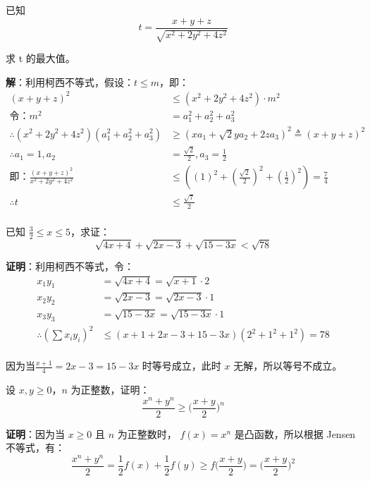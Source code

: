 \documentclass[12pt]{article}
\begin{document}
\begin{framed}
已知
$$
t = \frac{x + y + z}{\sqrt{x^2 + 2y^2 + 4z^2}}
$$ 

求 t 的最大值。

\textbf{解}：利用柯西不等式，假设：$t \le m$，即：
\begin{align*}
(x + y + z)^2 &\le (x^2 + 2y^2 + 4z^2)\cdot m^2 \\
\text{令：} m^2 &= a_1^2 + a_2^2 + a_3^2 \\
\therefore (x^2 + 2y^2 + 4z^2)(a_1^2 + a_2^2 + a_3^2) &\ge (xa_1 + \sqrt{2}ya_2 + 2za_3)^2 \triangleq (x + y + z)^2\\
\therefore a_1 = 1, a_2 &= \frac{\sqrt{2}}{2}, a_3 = \frac{1}{2} \\
\text{即：}\frac{(x + y + z)^2}{x^2 + 2y^2 + 4z^2} &\le ((1)^2 + (\frac{\sqrt{2}}{2})^2 + (\frac{1}{2})^2) = \frac{7}{4} \\
\therefore t &\le \frac{\sqrt{7}}{2} \\
\end{align*}
\end{framed}


\begin{framed}
已知 $ \frac{3}{2} \le x \le 5$，求证：
$$
\sqrt{4x+4} + \sqrt{2x-3} + \sqrt{15-3x} < \sqrt{78}
$$ 

\textbf{证明}：利用柯西不等式，令：
\begin{align*}
x_1y_1 &= \sqrt{4x + 4} = \sqrt{x+1} \cdot 2 \\
x_2y_2 &= \sqrt{2x-3} = \sqrt{2x-3} \cdot 1 \\
x_3y_3 &= \sqrt{15-3x} = \sqrt{15-3x} \cdot 1 \\
%
\therefore (\sum{x_iy_i})^2 &\le (x+1+2x-3+15-3x)(2^2+1^2+1^2) = 78 \\
\end{align*}

因为当$\frac{x+1}{4} = 2x-3 = 15-3x$ 时等号成立，此时 $x$ 无解，所以等号不成立。
\end{framed}

\begin{framed}
设 $x, y \ge 0$，$n$ 为正整数，证明：
$$
\frac{x^n + y^n}{2} \ge \Big(\frac{x+y}{2}\Big)^n
$$

\textbf{证明}：因为当 $x \ge 0$ 且 $n$ 为正整数时， $f(x) = x^n$ 是凸函数，所以根据 Jensen 不等式，有：
$$
\frac{x^n + y^n}{2} = \frac{1}{2}f(x) + \frac{1}{2}f(y) \ge f\Big(\frac{x+y}{2}\Big) = \Big(\frac{x+y}{2}\Big)^2
$$
\end{framed}
\end{document}
